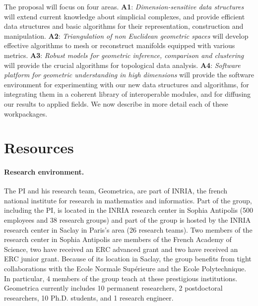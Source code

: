 The proposal will focus on four areas. {\bf  A1}:  {\em Dimension-sensitive data  structures} will extend current knowledge about simplicial complexes, and  provide efficient data structures and basic algorithms for their representation, construction and manipulation. 
  {\bf A2}:  {\em Triangulation of non Euclidean geometric spaces} will develop effective algorithms to mesh or reconstruct manifolds equipped with various metrics.   {\bf A3}: {\em Robust models for geometric inference, comparison and  clustering} will provide the crucial  algorithms for topological data analysis.
 {\bf A4}:  {\em  Software platform for geometric understanding in high dimensions} will provide the software environment for experimenting with our new data structures and algorithms, for integrating them in a coherent library of interoperable modules, and for diffusing our results to applied fields. We now describe in more detail each of these workpackages.












\section{Resources}

\paragraph{Research environment.}
The PI and his research team, Geometrica, are part of INRIA, the french national institute for research in mathematics and informatics. Part of the group, including the PI, is located in the INRIA research center in Sophia Antipolis  (500 employees and 38 research groups) and part of the group is hosted by the INRIA research center in Saclay in Paris's area (26 research teams). Two members of the research center in Sophia Antipolis are members of the French Academy of Science, two have received an ERC advanced grant and two have received an ERC junior grant. Because of its location in Saclay, the group benefits from tight collaborations with the Ecole Normale Sup\'erieure and the Ecole Polytechnique. In particular, 4 members of the group teach at these prestigious institutions. Geometrica currently includes 10 permanent researchers,  2 postdoctoral researchers, 10 Ph.D. students, and 1 research engineer. 


